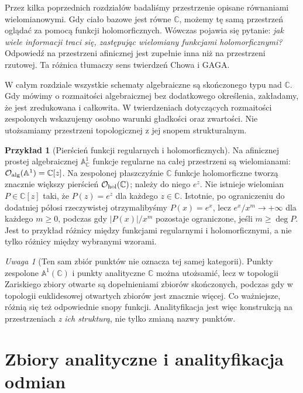 \documentclass[11pt,a4paper,openany]{report}
\numberwithin{equation}{section}
\theoremstyle{plain}
\theoremstyle{definition}
\newtheorem{przyklad}[twierdzenie]{Przykład}
\theoremstyle{remark}
\newtheorem{uwaga}[twierdzenie]{Uwaga}
\newcommand{\C}{\mathbb C}
\newcommand{\A}{\mathbb A}
\begin{document}
Przez kilka poprzednich rozdziałów badaliśmy przestrzenie opisane równaniami
wielomianowymi. Gdy ciało bazowe jest równe $\C$, możemy tę samą przestrzeń
oglądać za pomocą funkcji holomorficznych. Wówczas pojawia się pytanie:
\emph{jak wiele informacji traci się, zastępując wielomiany funkcjami
holomorficznymi?} Odpowiedź na przestrzeni afinicznej jest zupełnie inna niż
na przestrzeni rzutowej. Ta różnica tłumaczy sens twierdzeń Chowa i GAGA.

W całym rozdziale wszystkie schematy algebraiczne są skończonego typu nad
$\C$. Gdy mówimy o rozmaitości algebraicznej bez dodatkowego określenia,
zakładamy, że jest zredukowana i całkowita. W twierdzeniach dotyczących
rozmaitości zespolonych wskazujemy osobno warunki gładkości oraz zwartości.
Nie utożsamiamy przestrzeni topologicznej z jej snopem strukturalnym.

\begin{przyklad}[Pierścień funkcji regularnych i holomorficznych]
Na afinicznej prostej algebraicznej $\A^1_\C$ funkcje regularne na całej
przestrzeni są wielomianami: $\mathcal O_{\rm alg}(\A^1)=\C[z]$.
Na zespolonej płaszczyźnie $\C$ funkcje holomorficzne tworzą znacznie
większy pierścień $\mathcal O_{\rm hol}(\C)$; należy do niego $e^z$.
Nie istnieje wielomian $P\in\C[z]$ taki, że $P(z)=e^z$ dla każdego
$z\in\C$. Istotnie, po ograniczeniu do dodatniej półosi rzeczywistej
otrzymalibyśmy $P(x)=e^x$, lecz $e^x/x^m\to+\infty$ dla każdego
$m\ge0$, podczas gdy $|P(x)|/x^m$ pozostaje ograniczone, jeśli
$m\ge\deg P$. Jest to przykład różnicy między funkcjami regularnymi
i holomorficznymi, a nie tylko różnicy między wybranymi wzorami.
\end{przyklad}

\begin{uwaga}[Ten sam zbiór punktów nie oznacza tej samej kategorii]
Punkty zespolone $\A^1(\C)$ i punkty analityczne $\C$ można utożsamić,
lecz w topologii Zariskiego zbiory otwarte są dopełnieniami zbiorów
skończonych, podczas gdy w topologii euklidesowej otwartych zbiorów jest
znacznie więcej. Co ważniejsze, różnią się też odpowiednie snopy
funkcji. Analityfikacja jest więc konstrukcją na przestrzeniach
\emph{z ich strukturą}, nie tylko zmianą nazwy punktów.
\end{uwaga}

\section{Zbiory analityczne i analityfikacja odmian}
\label{sec:ga9-analityczne}
\end{document}
